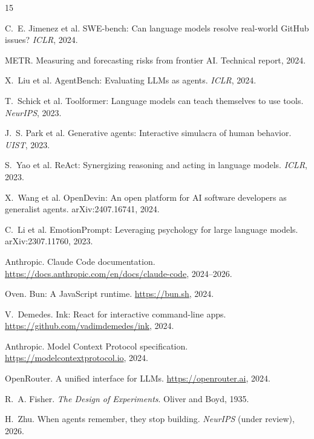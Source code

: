 \documentclass[10pt,a4paper]{article}
\begin{document}
\begin{thebibliography}{15}
\itemsep=1pt\parskip=0pt

C.~E. Jimenez et al.
SWE-bench: Can language models resolve real-world GitHub issues?
\emph{ICLR}, 2024.

METR.
Measuring and forecasting risks from frontier AI.
Technical report, 2024.

X.~Liu et al.
{AgentBench}: Evaluating {LLMs} as agents.
\emph{ICLR}, 2024.

T.~Schick et al.
Toolformer: Language models can teach themselves to use tools.
\emph{NeurIPS}, 2023.

J.~S. Park et al.
Generative agents: Interactive simulacra of human behavior.
\emph{UIST}, 2023.

S.~Yao et al.
{ReAct}: Synergizing reasoning and acting in language models.
\emph{ICLR}, 2023.

X.~Wang et al.
{OpenDevin}: An open platform for {AI} software developers as generalist agents.
arXiv:2407.16741, 2024.

C.~Li et al.
{EmotionPrompt}: Leveraging psychology for large language models.
arXiv:2307.11760, 2023.

Anthropic.
Claude Code documentation.
\url{https://docs.anthropic.com/en/docs/claude-code}, 2024--2026.

Oven.
Bun: A JavaScript runtime.
\url{https://bun.sh}, 2024.

V.~Demedes.
Ink: React for interactive command-line apps.
\url{https://github.com/vadimdemedes/ink}, 2024.

Anthropic.
Model Context Protocol specification.
\url{https://modelcontextprotocol.io}, 2024.

OpenRouter.
A unified interface for {LLMs}.
\url{https://openrouter.ai}, 2024.

R.~A. Fisher.
\emph{The Design of Experiments}.
Oliver and Boyd, 1935.

H.~Zhu.
When agents remember, they stop building.
\emph{NeurIPS} (under review), 2026.

\end{thebibliography}
\end{document}
